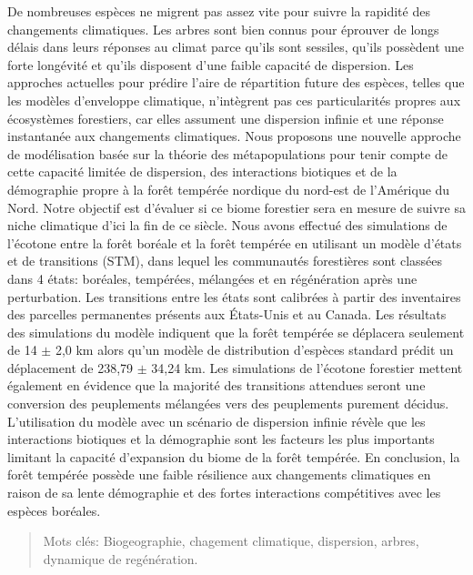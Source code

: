 \resume
\begin{singlespace}

  De nombreuses espèces ne migrent pas assez vite pour suivre la rapidité des changements
  climatiques. Les arbres sont bien connus pour éprouver de longs délais dans leurs réponses au
  climat parce qu'ils sont sessiles, qu'ils possèdent une forte longévité et qu'ils disposent d'une faible capacité de dispersion. Les approches actuelles pour prédire l'aire de répartition future des espèces,
  telles que les modèles d'enveloppe climatique, n'intègrent pas ces particularités
  propres aux écosystèmes forestiers, car elles assument une dispersion infinie et une réponse
  instantanée aux changements climatiques. Nous proposons une nouvelle approche de modélisation
  basée sur la théorie des métapopulations pour tenir compte de cette capacité limitée de
  dispersion, des interactions biotiques et de la démographie propre à la forêt tempérée nordique du
  nord-est de l'Amérique du Nord. Notre objectif est d'évaluer si ce biome forestier sera en mesure
  de suivre sa niche climatique d'ici la fin de ce siècle. Nous avons effectué des simulations de
  l'écotone entre la forêt boréale et la forêt tempérée en utilisant un modèle d'états et de transitions
  (STM), dans lequel les communautés forestières sont classées dans 4 états: boréales, tempérées,
  mélangées et en régénération après une perturbation. Les transitions entre les états sont
  calibrées à partir des inventaires des parcelles permanentes présents aux États-Unis et au Canada.
  Les résultats des simulations du modèle indiquent que la forêt tempérée se déplacera seulement de
  14 $\pm$ 2,0 km alors qu'un modèle de distribution d'espèces standard prédit un déplacement de
  238,79 $\pm$ 34,24 km. Les simulations de l'écotone forestier mettent également en évidence que la
  majorité des transitions attendues seront une conversion des peuplements mélangées vers des
  peuplements purement décidus. L'utilisation du modèle avec un scénario de dispersion infinie
  révèle que les interactions biotiques et la démographie sont les facteurs les plus importants limitant la capacité d'expansion du biome de la forêt tempérée. En conclusion, la forêt tempérée
  possède une faible résilience aux changements climatiques en raison de sa lente démographie et des
  fortes interactions compétitives avec les espèces boréales.


  \begin{quote}
    Mots clés: Biogeographie, chagement climatique, dispersion, arbres, dynamique de regénération. 
  \end{quote}
\end{singlespace}
\cleardoublepage

